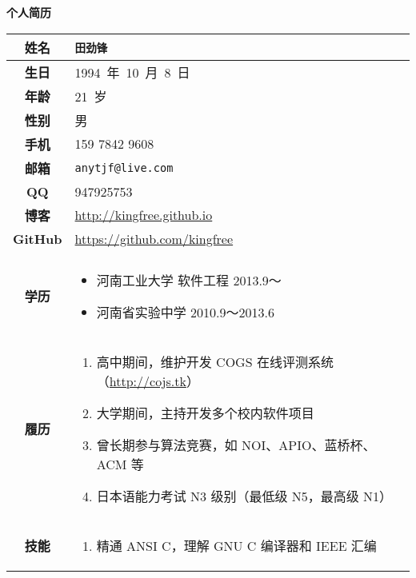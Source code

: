 \documentclass[11pt,a4paper,nofonts]{ctexart}
\def\tjf{{\tt{田劲锋}}}
\def\titlec{个人简历}
\begin{document}
\newcommand{\thh}[1]{{\bf{#1}}}
\CTEXnoindent

\begin{center}
{\Large\bf\titlec}

\vspace{0.5cm}

\begin{tabular}{|c|l|}\hline
\thh{姓名} & {\tjf} \\\hline
\thh{生日} & {1994~年~10~月~8~日} \\\hline
\thh{年龄} & {21~岁} \\\hline
\thh{性别} & {男} \\\hline
\thh{手机} & {159 7842 9608} \\\hline
\thh{邮箱} & {\tt anytjf@live.com} \\\hline
\thh{QQ} & {947925753} \\\hline
\thh{博客} & {\url{http://kingfree.github.io}} \\\hline
\thh{GitHub} & {\url{https://github.com/kingfree}} \\\hline
\thh{} & {} \\\hline
\thh{学历} & {\begin{minipage}[c][4em]{12cm}
\begin{itemize}
\item 河南工业大学 软件工程 2013.9～
\item 河南省实验中学 2010.9～2013.6
\end{itemize}
\end{minipage}} \\\hline
\thh{履历} & {\begin{minipage}[c][7em]{12cm}
\begin{enumerate}
\item 高中期间，维护开发 COGS 在线评测系统（\url{http://cojs.tk}）
\item 大学期间，主持开发多个校内软件项目
\item 曾长期参与算法竞赛，如 NOI、APIO、蓝桥杯、ACM 等
\item 日本语能力考试 N3 级别（最低级 N5，最高级 N1）
\end{enumerate}
\end{minipage}} \\\hline
\thh{技能} & {\begin{minipage}[c][19em]{12cm}
\begin{enumerate}
\item 精通 ANSI C，理解 GNU C 编译器和 IEEE 汇编

\end{enumerate}
\end{minipage}}
\end{tabular}
\end{center}
\end{document}

